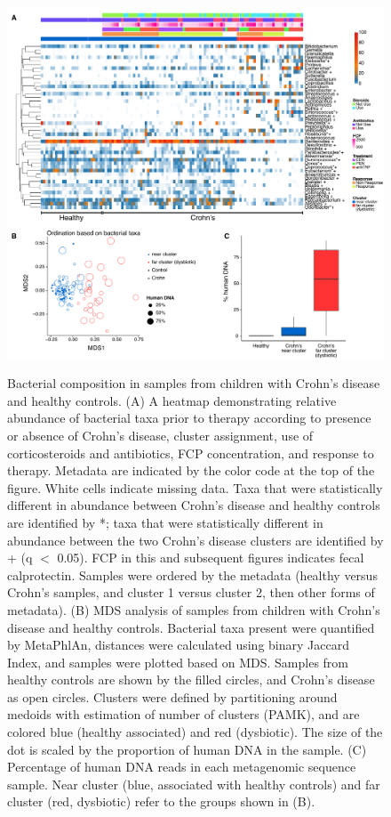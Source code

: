 \begin{figure}[p]
\centering
{\includegraphics[scale=0.37,trim=0 0 0 0,clip]{Figure/Fig21_Microbiome_Cluster_Heatmap.pdf}}
\caption[Bacterial composition in samples from children with Crohn's disease and healthy controls]{Bacterial composition in samples from children with Crohn's disease and healthy controls. (A) A heatmap demonstrating relative abundance of bacterial taxa prior to therapy according to presence or absence of Crohn's disease, cluster assignment, use of corticosteroids and antibiotics, FCP concentration, and response to therapy. Metadata are indicated by the color code at the top of the figure. White cells indicate missing data. Taxa that were statistically different in abundance between Crohn's disease and healthy controls are identified by *; taxa that were statistically different in abundance between the two Crohn's disease clusters are identified by + (q $<$ 0.05). FCP in this and subsequent figures indicates fecal calprotectin. Samples were ordered by the metadata (healthy versus Crohn's samples, and cluster 1 versus cluster 2, then other forms of metadata).
(B) MDS analysis of samples from children with Crohn's disease and healthy controls. Bacterial taxa present were quantified by MetaPhlAn, distances were calculated using binary Jaccard Index, and samples were plotted based on MDS. Samples from healthy controls are shown by the filled circles, and Crohn's disease as open circles. Clusters were defined by partitioning around medoids with estimation of number of clusters (PAMK), and are colored blue (healthy associated) and red (dysbiotic). The size of the dot is scaled by the proportion of human DNA in the sample.
(C) Percentage of human DNA reads in each metagenomic sequence sample. Near cluster (blue, associated with healthy controls) and far cluster (red, dysbiotic) refer to the groups shown in (B). }
\label{Fig21_Microbiome_Cluster_Heatmap}
\end{figure}


